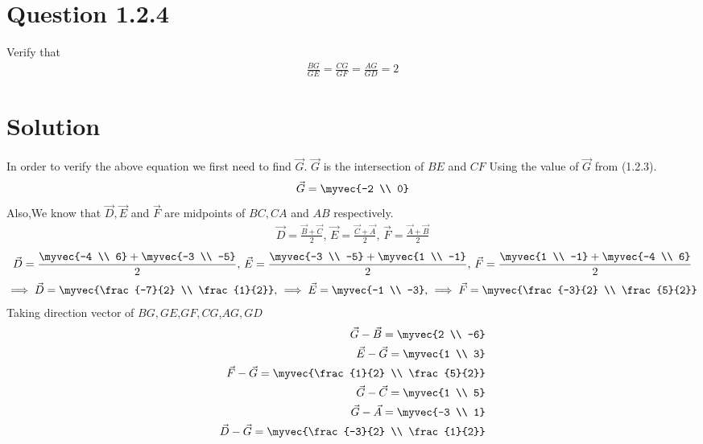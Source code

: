 \documentclass[journal,12pt,twocolumn]{IEEEtran}
\theoremstyle{remark}
\begin{document}
\section{Question 1.2.4}Verify that 
\begin{align}
		\frac{BG}{GE} = 
		\frac{CG}{GF} =
		\frac{AG}{GD} = 2 
\end{align}
\section{Solution}In order to verify the above equation we first need to find $\vec{G}$. 
$\vec{G}$ is the intersection of $BE$ and $CF$
Using the value of $\vec{G}$ from (1.2.3).
\begin{align}
\vec{G} = \myvec{-2 \\ 0}
\end{align}
Also,We know that $\vec{D}, \vec{E}$ and $\vec{F}$ are midpoints of $BC, CA$ and $AB$ respectively.
\begin{align}
		\vec{D} = \frac{\vec{B}+\vec{C}}{2},\,
		\vec{E} = \frac{\vec{C}+\vec{A}}{2},\,
		\vec{F} = \frac{\vec{A}+\vec{B}}{2}
\end{align}
\begin{align}
		\vec{D} = \frac{\myvec{-4 \\ 6}+\myvec{-3 \\ -5}}{2},\,
		\vec{E} = \frac{\myvec{-3 \\ -5}+\myvec{1 \\ -1}}{2},\,
		\vec{F} = \frac{\myvec{1 \\ -1}+\myvec{-4 \\ 6}}{2}
\end{align}
\begin{align}
		\implies\vec{D} = \myvec{\frac{-7}{2} \\ \frac{1}{2}},\,
		\implies\vec{E} = \myvec{-1 \\ -3},\,
		\implies\vec{F} = \myvec{\frac{-3}{2} \\ \frac{5}{2}}
\end{align}
Taking direction vector of $BG,GE$,$GF,CG$,$AG,GD$
\begin{align}
		\label{eq:tri-pts/12} \vec{G}-\vec{B} = \myvec{2 \\ -6} \\
		\label{eq:tri-pts/13} \vec{E}-\vec{G} = \myvec{1 \\ 3} \\
		\label{eq:tri-pts/14} \vec{F}-\vec{G} = \myvec{\frac{1}{2} \\ \frac{5}{2}} \\
		\label{eq:tri-pts/15} \vec{G}-\vec{C} = \myvec{1 \\ 5} \\
		\label{eq:tri-pts/16} \vec{G}-\vec{A} = \myvec{-3 \\ 1} \\
		\label{eq:tri-pts/17} \vec{D}-\vec{G} = \myvec{\frac{-3}{2} \\ \frac{1}{2}}
\end{align}
\end{document}
